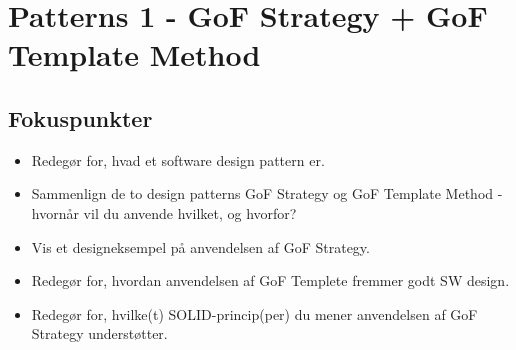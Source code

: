 \section{Patterns 1 - GoF Strategy + GoF Template Method}

\subsection{Fokuspunkter}

\begin{itemize}
	\item Redegør for, hvad et software design pattern er.
	\item Sammenlign de to design patterns GoF Strategy og GoF Template Method - hvornår vil du anvende hvilket, og hvorfor?
	\item Vis et designeksempel på anvendelsen af GoF Strategy.
	\item Redegør for, hvordan anvendelsen af GoF Templete fremmer godt SW design.
	\item Redegør for, hvilke(t) SOLID-princip(per) du mener anvendelsen af GoF Strategy understøtter.
\end{itemize}